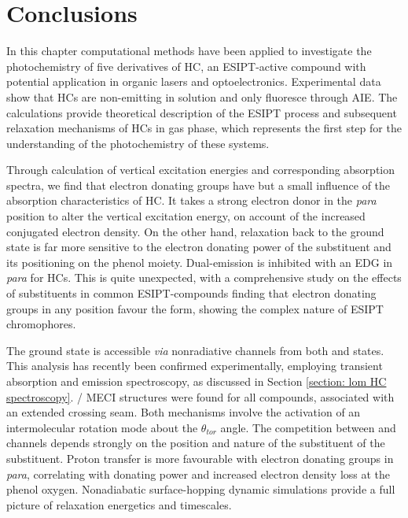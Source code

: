 \section{Conclusions}\label{section: NRdecay_Conclusions}
In this chapter computational methods have been applied to investigate the photochemistry of five derivatives of \ac{HC}, an ESIPT-active compound with potential application in organic lasers and optoelectronics. Experimental data show that \ac{HC}s are non-emitting in solution and only fluoresce through \ac{AIE}.\cite{Cheng2015} The calculations provide theoretical description of the ESIPT process and subsequent relaxation mechanisms of \ac{HC}s in gas phase, which represents the first step for the understanding of the photochemistry of these systems. 

Through calculation of vertical excitation energies and corresponding absorption spectra, we find that electron donating groups have but a small influence of the absorption characteristics of \ac{HC}. It takes a strong electron donor in the \textit{para} position to alter the vertical excitation energy, on account of the increased conjugated electron density. On the other hand, relaxation back to the ground state is far more sensitive to the electron donating power of the substituent and its positioning on the phenol moiety. Dual-emission is inhibited with an EDG in \textit{para} for \ac{HC}s. This is quite unexpected, with a comprehensive study on the effects of substituents in common ESIPT-compounds finding that electron donating groups in any position favour the \Estar{} form, showing the complex nature of ESIPT chromophores.\cite{Azarias2016}

The ground state is accessible \textit{via} nonradiative channels from both \Estar{} and \Kstar{} states. This analysis has recently been confirmed experimentally,  employing transient absorption and emission spectroscopy, as discussed in Section \ref{section: lom HC spectroscopy}.\cite{Song2018,Zahid2017} \sone/\szero{} MECI structures were found for all compounds, associated with an extended crossing seam. Both mechanisms involve the activation of an intermolecular rotation mode about the $\theta_{tor}$ angle. The competition between \Estar{} and \Kstar{} channels depends strongly on the position and nature of the substituent of the substituent. Proton transfer is more favourable with electron donating groups in \textit{para}, correlating with donating power and increased electron density loss at the phenol oxygen. Nonadiabatic surface-hopping dynamic simulations provide a full picture of relaxation energetics and timescales. 

